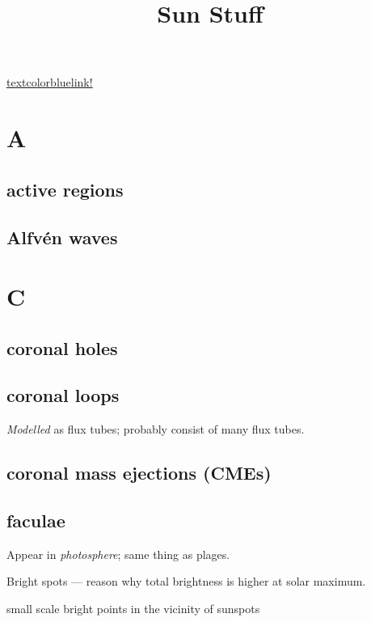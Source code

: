 \documentclass[12pt]{article}
\title{\vspace{-0.5in}Sun Stuff}
\author{}
\date{}
\begin{document}
\maketitle

\vspace{-1in}

\href{http://solarscience.msfc.nasa.gov/feature3.shtml}
{textcolor{blue}{link!}}

\section*{A}

\subsection*{active regions}

\subsection*{Alfv\'en waves}

\section*{C}

\subsection*{coronal holes}

\subsection*{coronal loops}
\begin{itemize*}
    \item \emph{Modelled} as flux tubes; probably consist of
        many flux tubes.
\end{itemize*}

\subsection*{coronal mass ejections (CMEs)}

\subsection*{faculae}
    \begin{itemize*}
        \item Appear in \emph{photosphere}; same thing as plages.
        \item Bright spots --- reason why total brightness is higher at
            solar maximum.
        \item small scale bright points in the vicinity of sunspots
    \end{itemize*}
\end{document}
